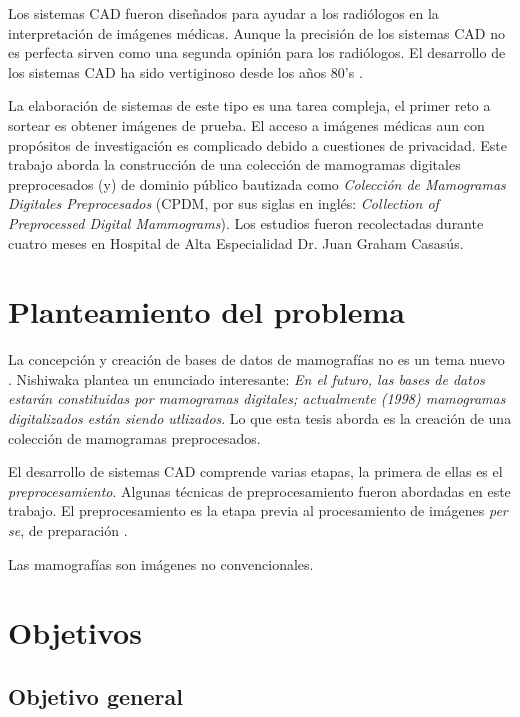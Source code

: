 Los sistemas CAD fueron diseñados para ayudar a los radiólogos en la
interpretación de imágenes médicas. Aunque la precisión de los sistemas CAD no
es perfecta \cite{fenton2007influence} sirven como una segunda opinión para los
radiólogos. El desarrollo de los sistemas CAD ha sido vertiginoso desde los
años 80's \cite{giger2008anniversary}.

La elaboración de sistemas de este tipo es una tarea compleja, el primer reto a
sortear es obtener imágenes de prueba. El acceso a imágenes médicas aun con
propósitos de investigación es complicado debido a cuestiones de privacidad.
Este trabajo aborda la construcción de una colección de mamogramas digitales
preprocesados (y) de dominio público bautizada como \textit{Colección de
Mamogramas Digitales Preprocesados} (CPDM, por sus siglas en inglés:
\textit{Collection of Preprocessed Digital Mammograms}). Los estudios fueron
recolectadas durante cuatro meses en Hospital de Alta Especialidad Dr. Juan
Graham Casasús.

\section{Planteamiento del problema}

La concepción y creación de bases de datos de mamografías no es un tema nuevo
\cite{nishikawa1998mammographic}. Nishiwaka plantea un enunciado interesante:
\textit{En el futuro, las bases de datos estarán constituidas por mamogramas
digitales; actualmente (1998) mamogramas digitalizados están siendo utlizados}.
Lo que esta tesis aborda es la creación de una colección de mamogramas
preprocesados.

El desarrollo de sistemas CAD comprende varias etapas, la primera de ellas es
el \textit{preprocesamiento}. Algunas técnicas de preprocesamiento fueron
abordadas en este trabajo. El preprocesamiento es la etapa previa al
procesamiento de imágenes \textit{per se}, de preparación
\cite{ponraj2011survey}. 


Las mamografías son imágenes no convencionales.

\section{Objetivos}

\subsection{Objetivo general} 

